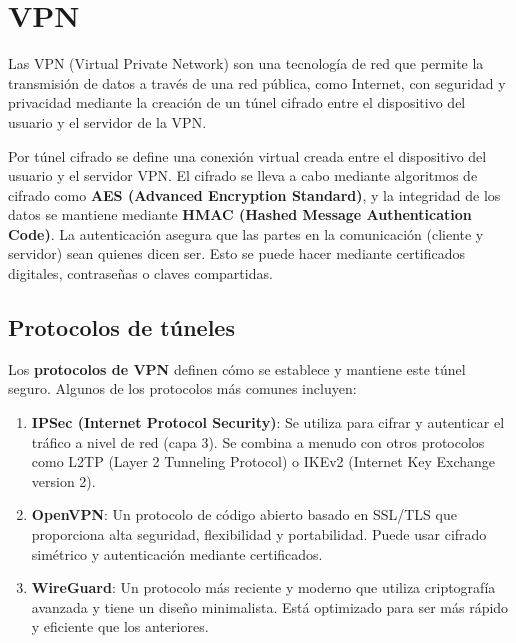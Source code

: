 \section{VPN} %
Las VPN (Virtual Private Network) son una tecnología de red que permite la transmisión de datos a través de una red pública, como Internet, con seguridad y privacidad mediante la creación de un túnel cifrado entre el dispositivo del usuario y el servidor de la VPN. 

Por túnel cifrado se define una conexión virtual creada entre el dispositivo del usuario y el servidor VPN. El cifrado se lleva a cabo mediante algoritmos de cifrado como \textbf{AES (Advanced Encryption Standard)}, y la integridad de los datos se mantiene mediante \textbf{HMAC (Hashed Message Authentication Code)}. La autenticación asegura que las partes en la comunicación (cliente y servidor) sean quienes dicen ser. Esto se puede hacer mediante certificados digitales, contraseñas o claves compartidas.

\subsection{Protocolos de túneles}

Los \textbf{protocolos de VPN} definen cómo se establece y mantiene este túnel seguro. Algunos de los protocolos más comunes incluyen:
\begin{enumerate}
   \item \textbf{IPSec (Internet Protocol Security)}: Se utiliza para cifrar y autenticar el tráfico a nivel de red (capa 3). Se combina a menudo con otros protocolos como L2TP (Layer 2 Tunneling Protocol) o IKEv2 (Internet Key Exchange version 2).
   \item \textbf{OpenVPN}: Un protocolo de código abierto basado en SSL/TLS que proporciona alta seguridad, flexibilidad y portabilidad. Puede usar cifrado simétrico y autenticación mediante certificados.
   
   \item \textbf{WireGuard}: Un protocolo más reciente y moderno que utiliza criptografía avanzada y tiene un diseño minimalista. Está optimizado para ser más rápido y eficiente que los anteriores.
\end{enumerate}

